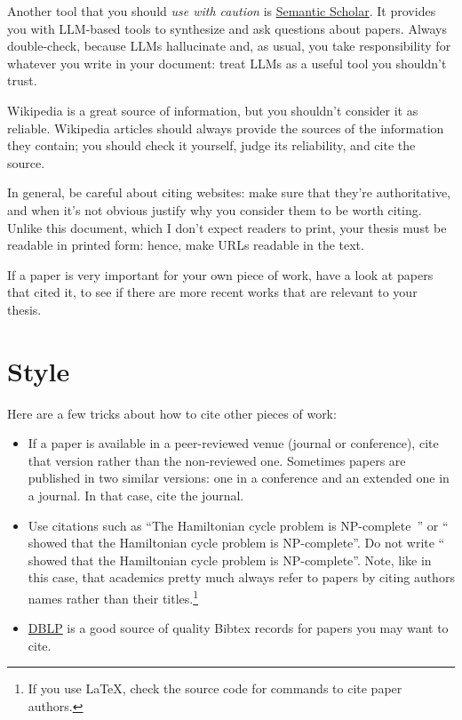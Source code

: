 Another tool that you should \emph{use with caution} is \href{https://www.semanticscholar.org/}{Semantic Scholar}. It provides you with \ac{LLM}-based tools to synthesize and ask questions about papers. Always double-check, because \acp{LLM} hallucinate and, as usual, you take responsibility for whatever you write in your document: treat \acp{LLM} as a useful tool you shouldn't trust.

Wikipedia is a great source of information, but you shouldn't consider it as reliable.
Wikipedia articles should always provide the sources of the information they contain; you
should check it yourself, judge its reliability, and cite the source.

In general, be careful about citing websites: make sure that they're authoritative, and when it's not obvious justify why you consider them to be worth citing. Unlike this document, which I don't expect readers to print, your thesis must be readable in printed form: hence, make URLs readable in the text.

If a paper is very important for your own piece of work, have a look at papers
that cited it, to see if there are more recent works that are relevant to your thesis.

\section{Style}

Here are a few tricks about how to cite other pieces of work:
\begin{itemize}
  \item If a paper is available in a peer-reviewed venue (journal or conference), cite that
  version rather than the non-reviewed one. Sometimes papers are published in two similar
  versions: one in a conference and an extended one in a journal. In that case, cite the
  journal.
  \item Use citations such as ``The Hamiltonian cycle problem is
  NP-complete~\cite{DBLP:conf/coco/Karp72}'' or ``\textcite{DBLP:conf/coco/Karp72} showed
  that the Hamiltonian cycle problem is NP-complete''. Do not write
  ``\cite{DBLP:conf/coco/Karp72} showed that the Hamiltonian cycle problem is NP-complete''. Note, like in this case, that academics pretty much always refer to papers by citing authors names rather than their titles.\footnote{If you use \LaTeX, check the source code for commands to cite paper authors.}
  \item \href{https://dblp.org}{DBLP} is a good source of quality Bibtex records for papers
  you may want to cite.
\end{itemize}
